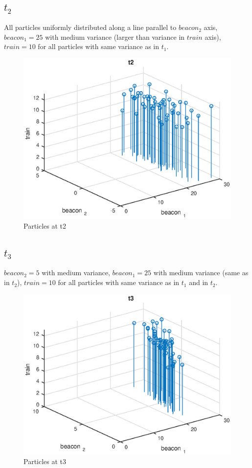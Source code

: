 \documentclass{article}
\begin{document}
\subsection{$t_2$}

All particles uniformly distributed along a line parallel to $beacon_2$ axis, $beacon_1 = 25$ with medium  variance (larger than variance in $train$ axis), $train=10$ for all particles with same variance as in $t_1$.


\begin{figure}[H]
	\centering
	\includegraphics[width=0.8\linewidth]{figures/t2.eps}
	\caption{Particles at t2}
	\label{t2}
\end{figure}


\subsection{$t_3$}

$beacon_2 = 5$ with medium variance, $beacon_1 = 25$ with medium  variance (same as in $t_2$), $train=10$ for all particles with same variance as in $t_1$ and in $t_2$.


\begin{figure}[H]
	\centering
	\includegraphics[width=0.8\linewidth]{figures/t3.eps}
	\caption{Particles at t3}
	\label{t3}
\end{figure}
\end{document}
